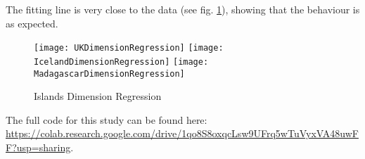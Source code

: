 The fitting line is very close to the data (see fig. \ref{fig:islandsDimensionRegression}), showing that the behaviour is as expected.

\begin{figure}[!h]
	\texttt{[image: UKDimensionRegression]}
	\hspace{0.25cm}
	\texttt{[image: IcelandDimensionRegression]}
	\hspace{0.25cm}
	\texttt{[image: MadagascarDimensionRegression]}
	\centering
	\caption{Islands Dimension Regression}
	\label{fig:islandsDimensionRegression}
\end{figure}

The full code for this study can be found here: \url{https://colab.research.google.com/drive/1qo8S8oxqcLsw9UFrq5wTuVyxVA48uwFF?usp=sharing}.

